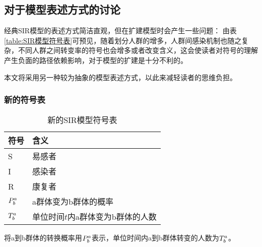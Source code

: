 \subsection{对于模型表述方式的讨论}
\par 经典SIR模型的表述方式简洁直观，但在扩建模型时会产生一些问题：
由表\ref{table:SIR模型符号表}可预见，随着划分人群的增多，人群间感染机制也随之复杂，不同人群之间转变率的符号也会增多或者改变含义，这会使读者对符号的理解产生负面的路径依赖影响，对于模型的扩建是十分不利的。
\par 本文将采用另一种较为抽象的模型表述方式，以此来减轻读者的思维负担。
\subsubsection{新的符号表}
\begin{table}[H]
	\centering
	\caption{新的SIR模型符号表}
	\begin{tabular}{ll}
		\hline
		符号&含义\\
		\hline
		S&易感者\\
		I&感染者\\
		R&康复者\\
		$\P{a}{b}$&a群体变为b群体的概率\\
		$\T{a}{b}$&单位时间$t$内a群体变为b群体的人数\\
		\hline
	\end{tabular}
\end{table}
\par 将a到b群体的转换概率用$\P{a}{b}$表示，单位时间内a到b群体转变的人数为$\T{a}{b}$。
